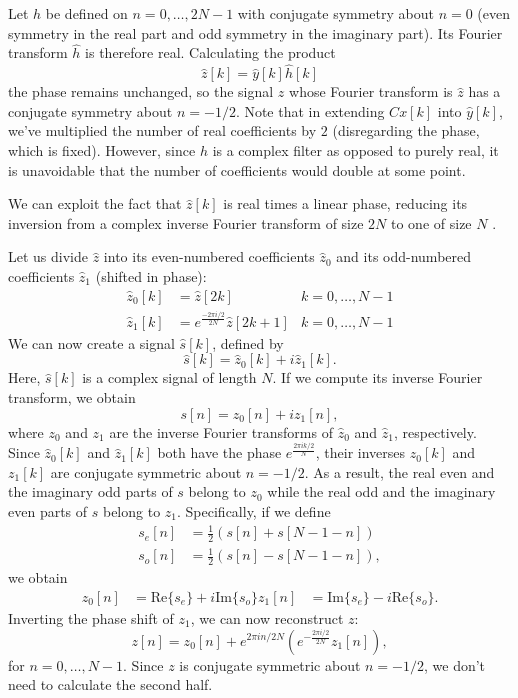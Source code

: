 \documentclass[twocolumn]{article}
\begin{document}
Let $h$ be defined on $n=0,\ldots,2N-1$ with conjugate symmetry about $n=0$ (even symmetry in the real part and odd symmetry in the imaginary part). Its Fourier transform $\hat{h}$ is therefore real. Calculating the product
\[
\hat{z}[k] = \hat{y}[k]\hat{h}[k]
\]
the phase remains unchanged, so the signal $z$ whose Fourier transform is $\hat{z}$ has a conjugate symmetry about $n=-1/2$. Note that in extending $Cx[k]$ into $\hat{y}[k]$, we've multiplied the number of real coefficients by $2$ (disregarding the phase, which is fixed). However, since $h$ is a complex filter as opposed to purely real, it is unavoidable that the number of coefficients would double at some point.

We can exploit the fact that $\hat{z}[k]$ is real times a linear phase, reducing its inversion from a complex inverse Fourier transform of size $2N$ to one of size $N$ \cite{brigham}.

Let us divide $\hat{z}$ into its even-numbered coefficients $\hat{z}_0$ and its odd-numbered coefficients $\hat{z}_1$ (shifted in phase):
\begin{align*}
\hat{z}_0[k] &= \hat{z}[2k] & k=0,\ldots,N-1 \\
\hat{z}_1[k] &= e^{\frac{-2\pi i/2}{2N}}\hat{z}[2k+1] & k=0,\ldots,N-1
\end{align*}
We can now create a signal $\hat{s}[k]$, defined by
\[
\hat{s}[k] = \hat{z}_0[k]+i\hat{z}_1[k].
\]
Here, $\hat{s}[k]$ is a complex signal of length $N$. If we compute its inverse Fourier transform, we obtain
\[
s[n] = z_0[n]+iz_1[n],
\]
where $z_0$ and $z_1$ are the inverse Fourier transforms of $\hat{z}_0$ and $\hat{z}_1$, respectively. Since $\hat{z}_0[k]$ and $\hat{z}_1[k]$ both have the phase $e^{\frac{2\pi i k/2}{N}}$, their inverses $z_0[k]$ and $z_1[k]$ are conjugate symmetric about $n=-1/2$. As a result, the real even and the imaginary odd parts of $s$ belong to $z_0$ while the real odd and the imaginary even parts of $s$ belong to $z_1$. Specifically, if we define
\begin{align*}
s_e[n] &= \frac{1}{2}\left(s[n]+s[N-1-n]\right) \\
s_o[n] &= \frac{1}{2}\left(s[n]-s[N-1-n]\right),
\end{align*}
we obtain
\begin{align*}
z_0[n] &= \mathrm{Re}\{s_e\}+i\mathrm{Im}\{s_o\}
z_1[n] &= \mathrm{Im}\{s_e\}-i\mathrm{Re}\{s_o\}.
\end{align*}
Inverting the phase shift of $z_1$, we can now reconstruct $z$:
\[
z[n] = z_0[n]+e^{2\pi i n/2N}\left(e^{-\frac{2\pi i/2}{2N}}z_1[n]\right),
\]
for $n=0,\ldots,N-1$. Since $z$ is conjugate symmetric about $n=-1/2$, we don't need to calculate the second half.
\end{document}
